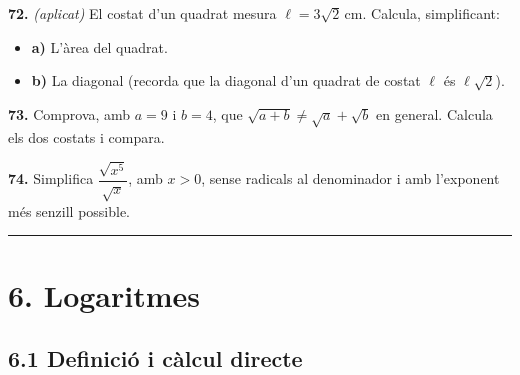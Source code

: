 \documentclass[13pt,a4paper]{extarticle}
\begin{document}
\par\noindent\begin{minipage}{\linewidth}
\textbf{72.} \emph{(aplicat)} El costat d'un quadrat mesura $\ell=3\sqrt2\,\text{cm}$. Calcula, simplificant:\par

\begin{itemize}[leftmargin=0pt,itemsep=3pt,topsep=3pt,parsep=0pt,label={}]
\item \textbf{a)} L'àrea del quadrat.
\item \textbf{b)} La diagonal (recorda que la diagonal d'un quadrat de costat $\ell$ és $\ell\sqrt2$).
\end{itemize}
\end{minipage}\par\vspace{1.6mm}
\par\noindent\begin{minipage}{\linewidth}
\textbf{73.} Comprova, amb $a=9$ i $b=4$, que $\sqrt{a+b}\neq\sqrt{a}+\sqrt{b}$ en general. Calcula els dos costats i compara.\par
\end{minipage}\par\vspace{1.6mm}
\par\noindent\begin{minipage}{\linewidth}
\textbf{74.} Simplifica $\dfrac{\sqrt{x^5}}{\sqrt{x}}$, amb $x>0$, sense radicals al denominador i amb l'exponent més senzill possible.\par
\end{minipage}\par\vspace{1.6mm}
\vspace{1mm}\hrule\vspace{3mm}

\section*{6. Logaritmes}

\subsection*{6.1 Definició i càlcul directe}
\end{document}
